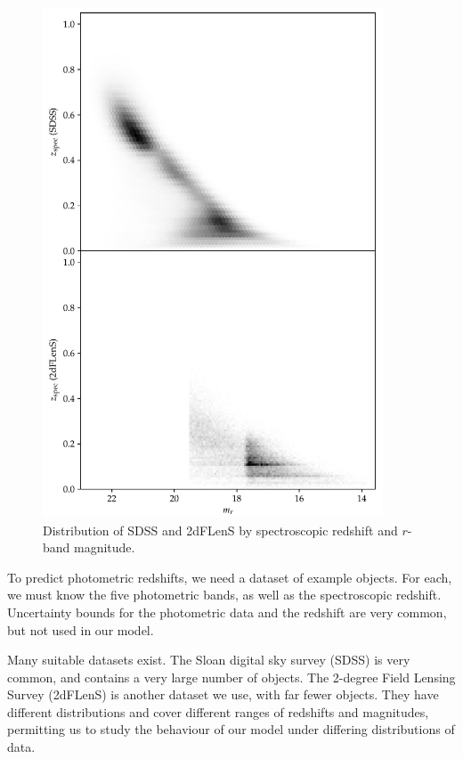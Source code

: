 \documentclass[11pt,twoside,openright]{report}
\begin{document}
  \begin{figure}
    \centering
    \includegraphics[width=0.9\textwidth]{r_z_plot.pdf}
    \caption{Distribution of SDSS and 2dFLenS by spectroscopic redshift and $r$-band magnitude.}
    \label{fig:r_z_plot}
  \end{figure}

  To predict photometric redshifts, we need a dataset of example objects. For each, we must know the five photometric bands, as well as the spectroscopic redshift. Uncertainty bounds for the photometric data and the redshift are very common, but not used in our model.

  Many suitable datasets exist. The Sloan digital sky survey (SDSS) is very common, and contains a very large number of objects. The 2-degree Field Lensing Survey (2dFLenS) is another dataset we use, with far fewer objects. They have different distributions and cover different ranges of redshifts and magnitudes, permitting us to study the behaviour of our model under differing distributions of data.
\end{document}
